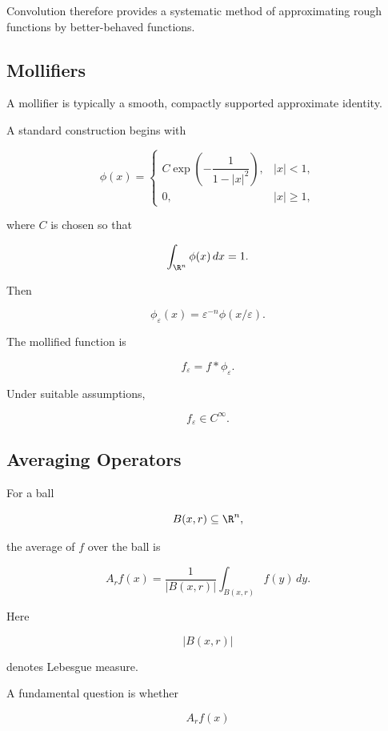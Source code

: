 Convolution therefore provides a systematic method of approximating
rough functions by better-behaved functions.

\subsection{Mollifiers}
\label{subsec:mollifiers}

A mollifier is typically a smooth, compactly supported approximate
identity.

A standard construction begins with

\[
\phi(x)
=
\begin{cases}
C\exp\left(-\dfrac{1}{1-|x|^2}\right),
& |x|<1,\\[2mm]
0,
& |x|\geq1,
\end{cases}
\]

where \(C\) is chosen so that

\[
\int_{\R^n}\phi(x)\,dx=1.
\]

Then

\[
\boxed{
\phi_\varepsilon(x)
=
\varepsilon^{-n}
\phi(x/\varepsilon).
}
\]

The mollified function is

\[
\boxed{
f_\varepsilon
=
f*\phi_\varepsilon.
}
\]

Under suitable assumptions,

\[
f_\varepsilon\in C^\infty.
\]

\subsection{Averaging Operators}
\label{subsec:averaging-operators}

For a ball

\[
B(x,r)\subseteq\R^n,
\]

the average of \(f\) over the ball is

\[
\boxed{
A_rf(x)
=
\frac{1}{|B(x,r)|}
\int_{B(x,r)}f(y)\,dy.
}
\]

Here

\[
|B(x,r)|
\]

denotes Lebesgue measure.

A fundamental question is whether

\[
A_rf(x)
\]

